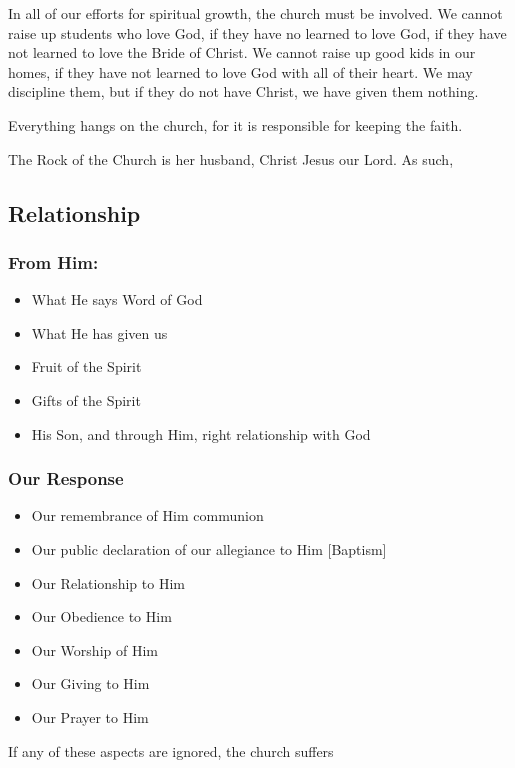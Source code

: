 \documentclass[CSHFoundation.tex]{subfiles}
\begin{document}
In all of our efforts for spiritual growth, the church must be involved. We cannot raise up students who love God, if they have no learned to love God, if they have not learned to love the Bride of Christ. We cannot raise up good kids in our homes, if they have not learned to love God with all of their heart. We may discipline them, but if they do not have Christ, we have given them nothing.


Everything hangs on the church, for it is responsible for keeping the faith.


The Rock of the Church is her husband, Christ Jesus our Lord. As such,

\subsection{Relationship}

\subsubsection{From Him:}

\begin{itemize}
\item What He says Word of God
\item What He has given us
\item Fruit of the Spirit
\item Gifts of the Spirit
\item His Son, and through Him, right relationship with God
\end{itemize}

\subsubsection{Our Response}



\begin{itemize}
\item Our remembrance of Him communion
\item Our public declaration of our allegiance to Him [Baptism]
\item Our Relationship to Him
\item Our Obedience to Him
\item Our Worship of Him
\item Our Giving to Him
\item Our Prayer to Him
\end{itemize}

If any of these aspects are ignored, the church suffers
\end{document}
